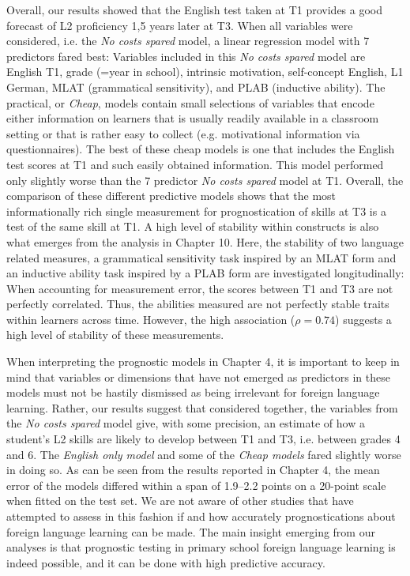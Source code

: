 \documentclass[output=paper]{langsci/langscibook}
\begin{document}
Overall, our results showed that the English test taken at T1 provides a good forecast of L2 proficiency 1,5 years later at T3. When all variables were considered, i.e. the \textit{No costs spared} model, a linear regression model with 7 predictors fared best: Variables included in this \textit{No costs spared} model are English T1, grade (=year in school), intrinsic motivation, self-concept English, L1 German, MLAT (grammatical sensitivity), and PLAB (inductive ability). The practical, or \textit{Cheap}, models contain small selections of variables that encode either information on learners that is usually readily available in a classroom setting or that is rather easy to collect (e.g. motivational information via questionnaires). The best of these cheap models is one that includes the English test scores at T1 and such easily obtained information. This model performed only slightly worse than the 7 predictor \textit{No costs spared} model at T1. Overall, the comparison of these different predictive models shows that the most informationally rich single measurement for prognostication of skills at T3 is a test of the same skill at T1. A high level of stability within constructs is also what emerges from the analysis in Chapter 10. Here,  the stability of two language related measures, a grammatical sensitivity task inspired by an MLAT form and an inductive ability task inspired by a PLAB form are investigated longitudinally: When accounting for measurement error, the scores between T1 and T3 are not perfectly correlated. Thus, the abilities measured are not perfectly stable traits within learners across time. However, the high association ($\rho = 0.74$) suggests a high level of stability of these measurements.

When interpreting the prognostic models in Chapter 4, it is important to keep in mind that variables or dimensions that have not emerged as predictors in these models must not be hastily dismissed as being irrelevant for foreign language learning. Rather, our results suggest that considered together, the variables from the \textit{No costs spared} model give, with some precision, an estimate of how a student’s L2 skills are likely to develop between T1 and T3, i.e. between grades 4 and 6. The \textit{English only model} and some of the \textit{Cheap models} fared slightly worse in doing so. As can be seen from the results reported in Chapter 4, the mean error of the models differed within a span of 1.9--2.2 points on a 20-point scale when fitted on the test set. We are not aware of other studies that have attempted to assess in this fashion if and how accurately prognostications about foreign language learning can be made. The main insight emerging from our analyses is that prognostic testing in primary school foreign language learning is indeed possible, and it can be done with high predictive accuracy.
\end{document}
